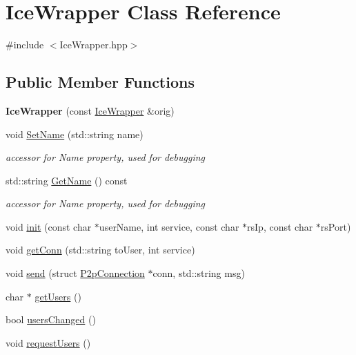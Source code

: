\hypertarget{classIceWrapper}{
\section{IceWrapper Class Reference}
\label{classIceWrapper}
}


{\ttfamily \#include $<$IceWrapper.hpp$>$}

\subsection*{Public Member Functions}
\begin{DoxyCompactItemize}
\item 
\hypertarget{classIceWrapper_a2957d299badf1008d3153cd5fd317918}{
{\bfseries IceWrapper} (const \hyperlink{classIceWrapper}{IceWrapper} \&orig)}
\label{classIceWrapper_a2957d299badf1008d3153cd5fd317918}

\item 
\hypertarget{classIceWrapper_a9d42e24532ed731e52ee59988200ad52}{
void \hyperlink{classIceWrapper_a9d42e24532ed731e52ee59988200ad52}{SetName} (std::string name)}
\label{classIceWrapper_a9d42e24532ed731e52ee59988200ad52}

\begin{DoxyCompactList}\small\item\em accessor for Name property, used for debugging \item\end{DoxyCompactList}\item 
\hypertarget{classIceWrapper_a7d2ada37e29bf229edc0fb3e05151b1d}{
std::string \hyperlink{classIceWrapper_a7d2ada37e29bf229edc0fb3e05151b1d}{GetName} () const }
\label{classIceWrapper_a7d2ada37e29bf229edc0fb3e05151b1d}

\begin{DoxyCompactList}\small\item\em accessor for Name property, used for debugging \item\end{DoxyCompactList}\item 
void \hyperlink{classIceWrapper_a9e34cb1f8e4a8b0361cb926c57971cab}{init} (const char $\ast$userName, int service, const char $\ast$rsIp, const char $\ast$rsPort)
\item 
void \hyperlink{classIceWrapper_a9577eeda39e60b4abc835c3ce81604f8}{getConn} (std::string toUser, int service)
\item 
void \hyperlink{classIceWrapper_a35ad9141a6f4a9f57f842c9f807f99bc}{send} (struct \hyperlink{structP2pConnection}{P2pConnection} $\ast$conn, std::string msg)
\item 
char $\ast$ \hyperlink{classIceWrapper_a7c19df1031dcd86d2133c5a179bb7ece}{getUsers} ()
\item 
bool \hyperlink{classIceWrapper_a648c6cda7c64d23fa210e6e62609644d}{usersChanged} ()
\item 
void \hyperlink{classIceWrapper_a1e68094e92efc427f584c682c8a470fb}{requestUsers} ()
\end{DoxyCompactItemize}
